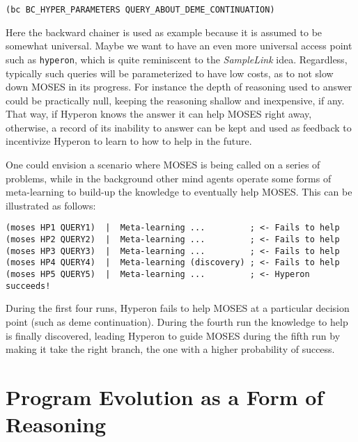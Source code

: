 \documentclass[]{report}
\begin{document}
\begin{verbatim}
(bc BC_HYPER_PARAMETERS QUERY_ABOUT_DEME_CONTINUATION)
\end{verbatim}
Here the backward chainer is used as example because it is assumed to
be somewhat universal.  Maybe we want to have an even more universal
access point such as \texttt{hyperon}, which is quite
reminiscent to the \emph{SampleLink} idea.  Regardless, typically such
queries will be parameterized to have low costs, as to not slow down
MOSES in its progress.  For instance the depth of reasoning used to
answer could be practically null, keeping the reasoning shallow and
inexpensive, if any.  That way, if Hyperon knows the answer it can
help MOSES right away, otherwise, a record of its inability to answer
can be kept and used as feedback to incentivize Hyperon to learn to
how to help in the future.

One could envision a scenario where MOSES is being called on a series
of problems, while in the background other mind agents operate some
forms of meta-learning to build-up the knowledge to eventually help
MOSES.  This can be illustrated as follows:

{\small
\begin{verbatim}
(moses HP1 QUERY1)  |  Meta-learning ...         ; <- Fails to help
(moses HP2 QUERY2)  |  Meta-learning ...         ; <- Fails to help
(moses HP3 QUERY3)  |  Meta-learning ...         ; <- Fails to help
(moses HP4 QUERY4)  |  Meta-learning (discovery) ; <- Fails to help
(moses HP5 QUERY5)  |  Meta-learning ...         ; <- Hyperon succeeds!
\end{verbatim}
} During the first four runs, Hyperon fails to help MOSES at a
particular decision point (such as deme continuation).  During the
fourth run the knowledge to help is finally discovered, leading
Hyperon to guide MOSES during the fifth run by making it take the
right branch, the one with a higher probability of success.

\section{Program Evolution as a Form of Reasoning}
\end{document}
